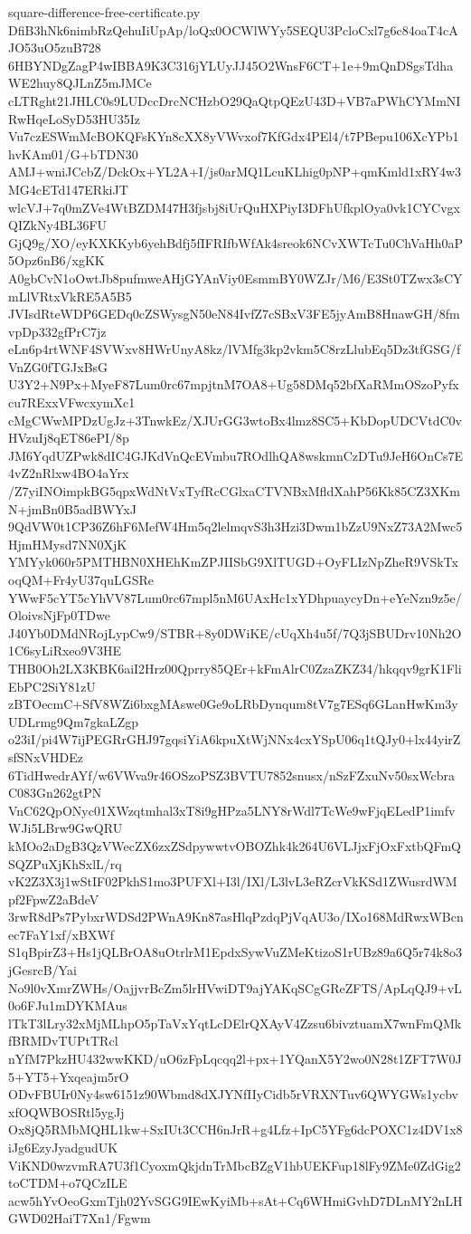 \documentclass[11pt]{article}
\theoremstyle{definition}
\theoremstyle{remark}
\begin{document}
\begin{filecontents*}[overwrite]{square-difference-free-certificate.py}
DfiB3hNk6nimbRzQehuIiUpAp/loQx0OCWlWYy5SEQU3PcloCxl7g6c84oaT4cAJO53uO5zuB728
6HBYNDgZagP4wIBBA9K3C316jYLUyJJ45O2WnsF6CT+1e+9mQnDSgsTdhaWE2huy8QJLnZ5mJMCe
cLTRght21JHLC0s9LUDccDrcNCHzbO29QaQtpQEzU43D+VB7aPWhCYMmNIRwHqeLoSyD53HU35Iz
Vu7czESWmMcBOKQFsKYn8cXX8yVWvxof7KfGdx4PEl4/t7PBepu106XcYPb1hvKAm01/G+bTDN30
AMJ+wniJCcbZ/DckOx+YL2A+I/js0arMQ1LcuKLhig0pNP+qmKmld1xRY4w3MG4cETd147ERkiJT
wlcVJ+7q0mZVe4WtBZDM47H3fjsbj8iUrQuHXPiyI3DFhUfkplOya0vk1CYCvgxQIZkNy4BL36FU
GjQ9g/XO/eyKXKKyb6yehBdfj5fIFRIfbWfAk4sreok6NCvXWTcTu0ChVaHh0aP5Opz6nB6/xgKK
A0gbCvN1oOwtJb8pufmweAHjGYAnViy0EsmmBY0WZJr/M6/E3St0TZwx3sCYmLlVRtxVkRE5A5B5
JVIsdRteWDP6GEDq0cZSWysgN50eN84IvfZ7cSBxV3FE5jyAmB8HnawGH/8fmvpDp332gfPrC7jz
eLn6p4rtWNF4SVWxv8HWrUnyA8kz/lVMfg3kp2vkm5C8rzLlubEq5Dz3tfGSG/fVnZG0fTGJxBsG
U3Y2+N9Px+MyeF87Lum0rc67mpjtnM7OA8+Ug58DMq52bfXaRMmOSzoPyfxcu7RExxVFwcxymXc1
cMgCWwMPDzUgJz+3TnwkEz/XJUrGG3wtoBx4lmz8SC5+KbDopUDCVtdC0vHVzuIj8qET86ePI/8p
JM6YqdUZPwk8dIC4GJKdVnQcEVmbu7ROdlhQA8wskmnCzDTu9JeH6OnCs7E4vZ2nRlxw4BO4aYrx
/Z7yiINOimpkBG5qpxWdNtVxTyfRcCGlxaCTVNBxMfldXahP56Kk85CZ3XKmN+jmBn0B5adBWYxJ
9QdVW0t1CP36Z6hF6MefW4Hm5q2lelmqvS3h3Hzi3Dwm1bZzU9NxZ73A2Mwc5HjmHMysd7NN0XjK
YMYyk060r5PMTHBN0XHEhKmZPJIISbG9XlTUGD+OyFLIzNpZheR9VSkTxoqQM+Fr4yU37quLGSRe
YWwF5cYT5cYhVV87Lum0rc67mpl5nM6UAxHc1xYDhpuaycyDn+eYeNzn9z5e/OloivsNjFp0TDwe
J40Yb0DMdNRojLypCw9/STBR+8y0DWiKE/cUqXh4u5f/7Q3jSBUDrv10Nh2O1C6syLiRxeo9V3HE
THB0Oh2LX3KBK6aiI2Hrz00Qprry85QEr+kFmAlrC0ZzaZKZ34/hkqqv9grK1FliEbPC2SiY81zU
zBTOecmC+SfV8WZi6bxgMAswe0Ge9oLRbDynqum8tV7g7ESq6GLanHwKm3yUDLrmg9Qm7gkaLZgp
o23iI/pi4W7ijPEGRrGHJ97gqsiYiA6kpuXtWjNNx4cxYSpU06q1tQJy0+lx44yirZsfSNxVHDEz
6TidHwedrAYf/w6VWva9r46OSzoPSZ3BVTU7852snusx/nSzFZxuNv50sxWcbraC083Gn262gtPN
VnC62QpONyc01XWzqtmhal3xT8i9gHPza5LNY8rWdl7TcWe9wFjqELedP1imfvWJi5LBrw9GwQRU
kMOo2aDgB3QzVWecZX6zxZSdpywwtvOBOZhk4k264U6VLJjxFjOxFxtbQFmQSQZPuXjKhSxlL/rq
vK2Z3X3j1wStIF02PkhS1mo3PUFXl+I3l/IXl/L3lvL3eRZcrVkKSd1ZWusrdWMpf2FpwZ2aBdeV
3rwR8dPs7PybxrWDSd2PWnA9Kn87asHlqPzdqPjVqAU3o/IXo168MdRwxWBcnec7FaY1xf/xBXWf
S1qBpirZ3+Hs1jQLBrOA8uOtrlrM1EpdxSywVuZMeKtizoS1rUBz89a6Q5r74k8o3jGesrcB/Yai
No9l0vXmrZWHs/OajjvrBcZm5lrHVwiDT9ajYAKqSCgGReZFTS/ApLqQJ9+vL0o6FJu1mDYKMAus
lTkT3lLry32xMjMLhpO5pTaVxYqtLcDElrQXAyV4Zzsu6bivztuamX7wnFmQMkfBRMDvTUPtTRcl
nYfM7PkzHU432wwKKD/uO6zFpLqcqq2l+px+1YQanX5Y2wo0N28t1ZFT7W0J5+YT5+Yxqeajm5rO
ODvFBUIr0Ny4sw6151z90Wbmd8dXJYNfIIyCidb5rVRXNTuv6QWYGWs1ycbvxfOQWBOSRtl5ygJj
Ox8jQ5RMbMQHL1kw+SxIUt3CCH6nJrR+g4Lfz+IpC5YFg6dcPOXC1z4DV1x8iJg6EzyJyadgudUK
ViKND0wzvmRA7U3f1CyoxmQkjdnTrMbcBZgV1hbUEKFup18lFy9ZMe0ZdGig2toCTDM+o7QCzILE
acw5hYvOeoGxmTjh02YvSGG9IEwKyiMb+sAt+Cq6WHmiGvhD7DLnMY2nLHGWD02HaiT7Xn1/Fgwm

\end{filecontents*}
\end{document}
